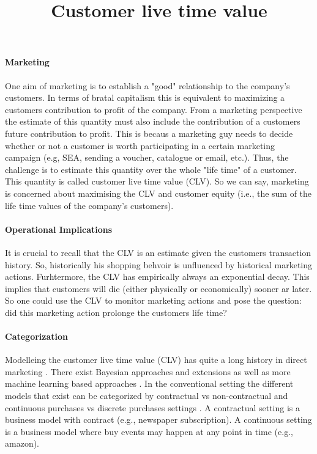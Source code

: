 \documentclass[10pt,a4paper]{article}
\title{Customer live time value}
\begin{document}
\maketitle
\paragraph*{Marketing}
One aim of marketing is to establish a "good" relationship to the company's customers. In terms of bratal capitalism this is equivalent to maximizing a customers contribution to profit of the company. From a marketing perspective the estimate of this quantity must also include the contribution of a customers future contribution to profit. This is becaus a marketing guy needs to decide whether or not a customer is worth participating in a certain marketing campaign (e.g, SEA, sending a voucher, catalogue or email, etc.). Thus, the challenge is to estimate this quantity over the whole "life time"  of a customer. This quantity is called customer live time value (CLV). So we can say, marketing is concerned about maximising the 
CLV and customer equity (i.e., the sum of the life
time values of the company’s customers).

\paragraph*{Operational Implications}
It is crucial to recall that the CLV is an estimate given the customers transaction history. So, historically his shopping behvoir is unfluenced by historical marketing actions. Furhtermore, the CLV has empirically always an exponential decay. This implies that customers will die (either physically or economically) sooner ar later. So one could use the CLV to monitor marketing actions and pose the question:  did this marketing action prolonge the customers life time?

\paragraph*{Categorization}
Modelleing the customer live time value (CLV) has quite a long history in direct marketing \cite{schmittlein_1987, Fader_2010_excel, gupta_2006}.  There exist Bayesian approaches and extensions \cite{2013arXiv1304.5380K, r_clv} as well as more machine learning based approaches \cite{asos_2017}. 
In the conventional setting the different models that exist can be categorized by contractual vs non-contractual and continuous purchases vs discrete purchases settings \cite{gauthier_clt_intro}. A contractual setting is a business model with contract (e.g., newspaper subscription). A continuous setting is a business model where buy events may happen at any point in time (e.g., amazon).
\end{document}
